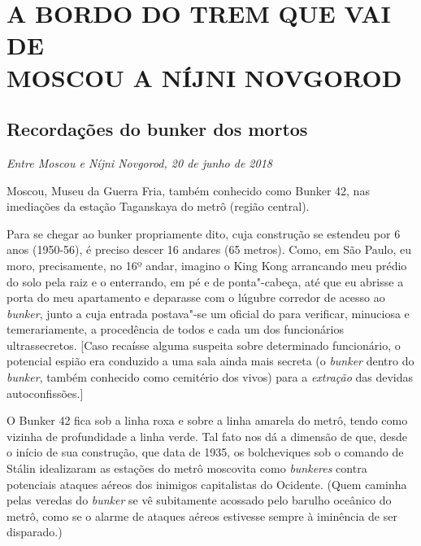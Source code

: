 \clearpage{\pagestyle{empty}\cleardoublepage}
\movetooddpage
{}
\part*{A BORDO DO TREM QUE VAI DE\\MOSCOU A NÍJNI NOVGOROD}

\chapter*{Recordações do bunker dos mortos}

\begin{flushright}
\emph{Entre Moscou e Níjni Novgorod, 20 de junho de 2018}
\end{flushright}


Moscou, Museu da Guerra Fria, também conhecido como Bunker 42, nas
imediações da estação Taganskaya do metrô (região central).

Para se chegar ao bunker propriamente dito, cuja construção se estendeu
por 6 anos (1950-56), é preciso descer 16 andares (65 metros). Como, em
São Paulo, eu moro, precisamente, no 16º andar, imagino o King Kong
arrancando meu prédio do solo pela raiz e o enterrando, em pé e de
ponta"-cabeça, até que eu abrisse a porta do meu apartamento e deparasse
com o lúgubre corredor de acesso ao \emph{bunker}, junto a cuja entrada
postava"-se um oficial do  para verificar, minuciosa e temerariamente,
a procedência de todos e cada um dos funcionários ultrassecretos.
{[}Caso recaísse alguma suspeita sobre determinado funcionário, o
potencial espião era conduzido a uma sala ainda mais secreta (o
\emph{bunker} dentro do \emph{bunker}, também conhecido como cemitério
dos vivos) para a \emph{extração} das devidas autoconfissões.{]}

O Bunker 42 fica sob a linha roxa e sobre a linha amarela do metrô,
tendo como vizinha de profundidade a linha verde. Tal fato nos dá a
dimensão de que, desde o início de sua construção, que data de 1935, os
bolcheviques sob o comando de Stálin idealizaram as estações do metrô
moscovita como \emph{bunkeres} contra potenciais ataques aéreos dos
inimigos capitalistas do Ocidente. (Quem caminha pelas veredas do
\emph{bunker} se vê subitamente acossado pelo barulho oceânico do metrô,
como se o alarme de ataques aéreos estivesse sempre à iminência de ser
disparado.)

